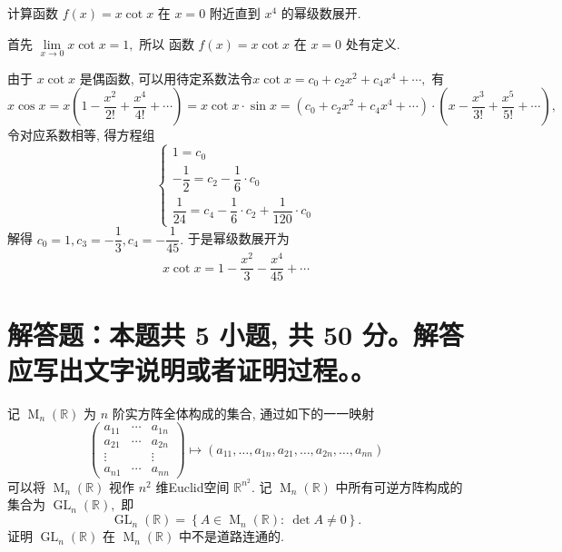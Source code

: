 \begin{question}[points = 10]
计算函数 $f(x) = x\cot x$ 在 $x = 0$ 附近直到 $x^4$ 的幂级数展开.

\end{question}

\begin{solution}
首先 $\lim\limits_{x \to 0} x\cot x = 1,$ 所以 函数 $f(x) = x\cot x$ 在 $x = 0$ 处有定义.

由于 $x\cot x$ 是偶函数, 可以用待定系数法令$x\cot x = c_0 + c_2 x^2 + c_4 x^4 + \cdots,$ 有
\[x\cos x = x\left( 1 - \dfrac{x^2}{2!} + \dfrac{x^4}{4!} + \cdots \right) = x\cot x \cdot \sin x = \left( c_0 + c_2 x^2 + c_4 x^4 + \cdots \right) \cdot \left(x - \dfrac{x^3}{3!} + \dfrac{x^5}{5!} + \cdots\right),\]
令对应系数相等, 得方程组
\[\begin{cases}
1 = c_0 \\
-\dfrac{1}{2} = c_2 - \dfrac{1}{6} \cdot c_0 \\
\dfrac{1}{24} = c_4 - \dfrac{1}{6} \cdot c_2 + \dfrac{1}{120} \cdot c_0
\end{cases}\]
解得 $c_0 = 1, c_3 = - \dfrac{1}{3}, c_4 = - \dfrac{1}{45}.$ 于是幂级数展开为
\[x\cot x = 1 - \dfrac{x^2}{3} - \dfrac{x^4}{45} + \cdots\]
\end{solution}


\showquestionpoints
\section{解答题：本题共 5 小题, 共 50 分。解答应写出文字说明或者证明过程。。}


\begin{question}[points = 8]
记 $\operatorname{M}_n(\mathbb{R})$ 为 $n$ 阶实方阵全体构成的集合, 通过如下的一一映射
\[\begin{pmatrix}
a_{11} & \cdots & a_{1n} \\
a_{21} & \cdots & a_{2n} \\
\vdots & & \vdots \\
a_{n1} & \cdots & a_{nn}
\end{pmatrix} \mapsto (a_{11}, \dots, a_{1n}, a_{21}, \dots, a_{2n}, \dots, a_{nn})\]
可以将 $\operatorname{M}_n(\mathbb{R})$ 视作 $n^2$ 维Euclid空间 $\mathbb{R}^{n^2}.$ 记 $\operatorname{M}_n(\mathbb{R})$ 中所有可逆方阵构成的集合为 $\operatorname{GL}_n(\mathbb{R}),$ 即
\[\operatorname{GL}_n(\mathbb{R}) = \left\{ A \in \operatorname{M}_n(\mathbb{R}): ~ \det A \neq 0 \right\}.\]
证明 $\operatorname{GL}_n(\mathbb{R})$ 在 $\operatorname{M}_n(\mathbb{R})$ 中不是道路连通的.

\end{question}

